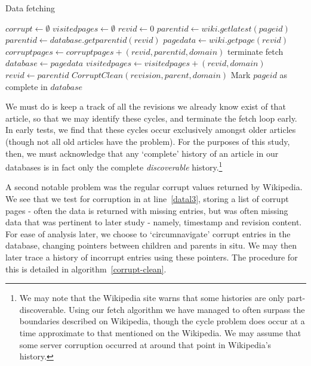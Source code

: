 \begin{algorithm}
  \caption{Data fetching}\label{alg-data}
  \begin{algorithmic}
    \State $corrupt \gets \emptyset$
    \State $visitedpages \gets \emptyset$
    \State $revid \gets 0$
    \State $parentid \gets wiki.getlatest(pageid)$
    \label{datal1} 
    \State $parentid \gets database.getparentid(revid)$
    \Else
    \State $pagedata \gets wiki.getpage(revid)$
    \EndIf
    \label{datal3}
    \State $corruptpages \gets corruptpages + (revid, parentid, domain)$
    \Else
    \State terminate fetch
    \EndIf
    \Else
    \State $database \gets page data$
    \EndIf
    \State $visitedpages \gets visitedpages + (revid, domain)$
    \State $revid \gets parentid$\label{datal2}
    \EndWhile
    \State $CorruptClean(revision, parent, domain)$
    \EndFor
    \State Mark $pageid$ as complete in $database$
    \EndProcedure
  \end{algorithmic}
\end{algorithm}

We must do is keep a track of all the revisions we already know exist
of that article, so that we may identify these cycles, and terminate
the fetch loop early. In early tests, we find that these cycles occur
exclusively amongst older articles (though not all old articles have
the problem). For the purposes of this study, then, we must
acknowledge that any `complete' history of an article in our databases
is in fact only the complete \textit{discoverable}
history.\footnote{We may note that the Wikipedia site warns that some
  histories are only part-discoverable. Using our fetch algorithm we
  have managed to often surpass the boundaries described on Wikipedia,
  though the cycle problem does occur at a time approximate to that
  mentioned on the Wikipedia. We may assume that some server
  corruption occurred at around that point in Wikipedia's history.}

A second notable problem was the regular corrupt values returned by
Wikipedia. We see that we test for corruption in at line~\ref{datal3},
storing a list of corrupt pages - often the data is returned with
missing entries, but was often missing data that was pertinent to
later study - namely, timestamp and revision content. For ease of
analysis later, we choose to `circumnavigate' corrupt entries in the
database, changing pointers between children and parents in situ. We
may then later trace a history of incorrupt entries using these
pointers. The procedure for this is detailed in
algorithm~\ref{corrupt-clean}.

